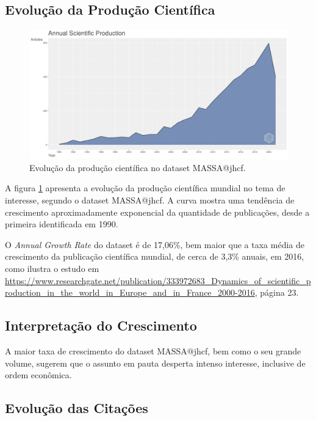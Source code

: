 \subsection{Evolução da Produção Científica}

\begin{figure}
    \centering
    \includegraphics[width=1\textwidth]{experiments/jhcf/PesqBibliogr/SimulacaoMultiagente/WoS-20210803/classico-mais-citacoes/Dataset/AnnualScientificProduction-2021-08-05.png}
    \caption{Evolução da produção científica no dataset MASSA@jhcf.}
    \label{fig:evol:anual:MASSA@jhcf}
\end{figure}

A figura \ref{fig:evol:anual:MASSA@jhcf} apresenta a evolução da produção científica mundial no tema de interesse, segundo o dataset MASSA@jhcf. A curva mostra uma tendência de crescimento aproximadamente exponencial da quantidade de publicações, desde a primeira identificada em 1990.

O \textit{Annual Growth Rate} do dataset é de 17,06\%, bem maior que a taxa média de crescimento da publicação científica mundial, de cerca de 3,3\% anuais, em 2016, como ilustra o estudo em \url{https://www.researchgate.net/publication/333972683_Dynamics_of_scientific_production_in_the_world_in_Europe_and_in_France_2000-2016}, página 23.

\subsection{Interpretação do Crescimento} A maior taxa de crescimento do dataset MASSA@jhcf, bem como o seu grande volume, sugerem que o assunto em pauta desperta intenso interesse, inclusive de ordem econômica.

\subsection{Evolução das Citações}

